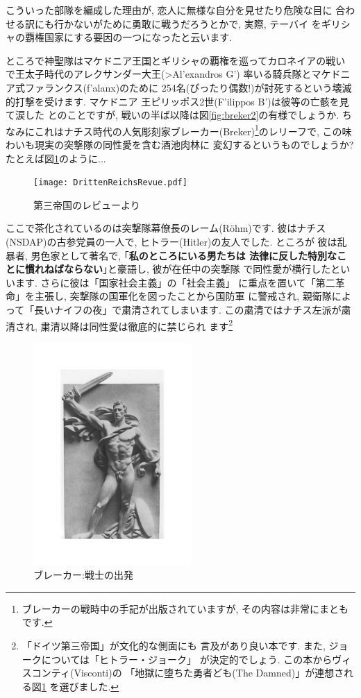 \documentclass[b5j,8pt,twocolumn]{ltjsarticle}
\newcommand{\textgreek}[1]{\begingroup\fontencoding{LGR}\selectfont#1\endgroup}
\begin{document}
こういった部隊を編成した理由が, 恋人に無様な自分を見せたり危険な目に
合わせる訳にも行かないがために勇敢に戦うだろうとかで, 実際, テーバイ
をギリシャの覇権国家にする要因の一つになったと云います.
\newline

ところで神聖隊はマケドニア王国とギリシャの覇権を巡ってカロネイアの戦い
で王太子時代のアレクサンダー大王(\textgreek{>Al'exandros G'})
率いる騎兵隊とマケドニア式ファランクス(\textgreek{f'alanx})のために
254名(ぴったり偶数!)が討死するという壊滅的打撃を受けます. マケドニア
王ピリッポス2世(\textgreek{F'ilippos B'})は彼等の亡骸を見て涙した
とのことですが, 戦いの半ば以降は図\ref{fig:breker2}の有様でしょうか.
 ちなみにこれはナチス時代の人気彫刻家ブレーカー(Breker)\footnote{
ブレーカーの戦時中の手記が出版されていますが, その内容は非常にまとも
です.}のレリーフで, この味わいも現実の突撃隊の同性愛を含む酒池肉林に
変幻するというものでしょうか? たとえば図\ref{fig:rrevue}のように...

\begin{figure}[htbp]
\begin{center}
\texttt{[image: DrittenReichsRevue.pdf]}
\caption{第三帝国のレビューより\cite{関}}
\label{fig:rrevue}
\end{center}
\end{figure}

ここで茶化されているのは突撃隊幕僚長のレーム(R\"ohm)です. 彼はナチス
(NSDAP)の古参党員の一人で, ヒトラー(Hitler)の友人でした. ところが
彼は乱暴者, 男色家として著名で, ｢\textbf{私のところにいる男たちは
法律に反した特別なことに慣れねばならない}｣と豪語し, 彼が在任中の突撃隊
で同性愛が横行したといいます. さらに彼は「国家社会主義」の「社会主義」
に重点を置いて「第二革命」を主張し, 突撃隊の国軍化を図ったことから国防軍
に警戒され, 親衛隊によって「長いナイフの夜」で粛清されてしまいます.
 この粛清ではナチス左派が粛清され, 粛清以降は同性愛は徹底的に禁じられ
ます\footnote{「ドイツ第三帝国」\cite{クラーザー}が文化的な側面にも
言及があり良い本です. また, ジョークについては「ヒトラー・ジョーク」
\cite{関}が決定的でしょう. この本からヴィスコンティ(Visconti)の
「地獄に堕ちた勇者ども(The Damned)」が連想される図\ref{fig:rrevue}
を選びました.}
\newpage

\begin{figure}
\includegraphics[width=6cm]{Breker2_relief.pdf}
\caption{ブレーカー:戦士の出発}
\label{fig:breker1}
\end{figure}
\end{document}
